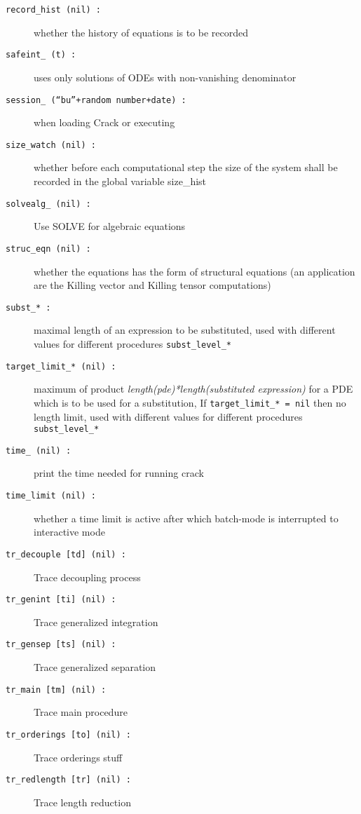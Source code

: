\documentclass[12pt]{article}
\begin{document}
\begin{description}
\item[{\tt record\_hist (nil) :}] whether the history of equations is
                    to be recorded 
\item[{\tt safeint\_ (t) :}] uses only solutions of ODEs with
                    non-vanishing denominator
\item[{\tt session\_ (``bu''+random number+date) :}] when loading {\sc Crack} or executing
\item[{\tt size\_watch (nil) :}] whether before each computational step 
                   the size of the system shall be recorded in the
                   global variable size\_hist
\item[{\tt solvealg\_ (nil) :}] Use SOLVE for algebraic equations
\item[{\tt struc\_eqn (nil) :}] whether the equations has the form of
                    structural equations (an application are the
                    Killing vector and Killing tensor computations)
\item[{\tt subst\_* :}] maximal length of an expression to be substituted,
                    used with different values for different
                    procedures {\tt subst\_level\_*}
\item[{\tt target\_limit\_* (nil) :}] maximum of product
                    {\em length(pde)*length(substituted expression)} for
                    a PDE which is to be used for a substitution,
                    If {\tt target\_limit\_* = nil} then no length limit,
                    used with different values for different
                    procedures {\tt subst\_level\_*}
\item[{\tt time\_ (nil) :}] print the time needed for running crack 
\item[{\tt time\_limit (nil) :}] whether a time limit is active after
                    which batch-mode is interrupted to interactive mode
\item[{\tt tr\_decouple [td] (nil) :}] Trace decoupling process
\item[{\tt tr\_genint [ti] (nil) :}] Trace generalized integration
\item[{\tt tr\_gensep [ts] (nil) :}] Trace generalized separation
\item[{\tt tr\_main [tm] (nil) :}] Trace main procedure
\item[{\tt tr\_orderings [to] (nil) :}] Trace orderings stuff
\item[{\tt tr\_redlength [tr] (nil) :}] Trace length reduction
\end{description}
\end{document}
